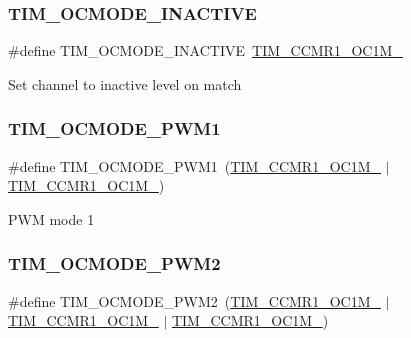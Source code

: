 \subsubsection{\texorpdfstring{TIM\_OCMODE\_INACTIVE}{TIM\_OCMODE\_INACTIVE}}
{\footnotesize\ttfamily \#define T\+I\+M\+\_\+\+O\+C\+M\+O\+D\+E\+\_\+\+I\+N\+A\+C\+T\+I\+VE~\mbox{\hyperlink{group___peripheral___registers___bits___definition_ga8b5f6ec25063483641d6dc065d96d2b5}{T\+I\+M\+\_\+\+C\+C\+M\+R1\+\_\+\+O\+C1\+M\+\_}}}

Set channel to inactive level on match \mbox{\label{group___t_i_m___output___compare__and___p_w_m__modes_ga766271da571888dfecd9130c3887e9c6}} 
\subsubsection{\texorpdfstring{TIM\_OCMODE\_PWM1}{TIM\_OCMODE\_PWM1}}
{\footnotesize\ttfamily \#define T\+I\+M\+\_\+\+O\+C\+M\+O\+D\+E\+\_\+\+P\+W\+M1~(\mbox{\hyperlink{group___peripheral___registers___bits___definition_gac024f6b9972b940925ab5786ee38701b}{T\+I\+M\+\_\+\+C\+C\+M\+R1\+\_\+\+O\+C1\+M\+\_}} $\vert$ \mbox{\hyperlink{group___peripheral___registers___bits___definition_ga8b5f6ec25063483641d6dc065d96d2b5}{T\+I\+M\+\_\+\+C\+C\+M\+R1\+\_\+\+O\+C1\+M\+\_}})}

P\+WM mode 1 \mbox{\label{group___t_i_m___output___compare__and___p_w_m__modes_ga88ce4251743c2c07e19fdd5a0a310580}} 
\subsubsection{\texorpdfstring{TIM\_OCMODE\_PWM2}{TIM\_OCMODE\_PWM2}}
{\footnotesize\ttfamily \#define T\+I\+M\+\_\+\+O\+C\+M\+O\+D\+E\+\_\+\+P\+W\+M2~(\mbox{\hyperlink{group___peripheral___registers___bits___definition_gac024f6b9972b940925ab5786ee38701b}{T\+I\+M\+\_\+\+C\+C\+M\+R1\+\_\+\+O\+C1\+M\+\_}} $\vert$ \mbox{\hyperlink{group___peripheral___registers___bits___definition_ga8b5f6ec25063483641d6dc065d96d2b5}{T\+I\+M\+\_\+\+C\+C\+M\+R1\+\_\+\+O\+C1\+M\+\_}} $\vert$ \mbox{\hyperlink{group___peripheral___registers___bits___definition_ga410a4752a98081bad8ab3f72b28e7c5f}{T\+I\+M\+\_\+\+C\+C\+M\+R1\+\_\+\+O\+C1\+M\+\_}})}

